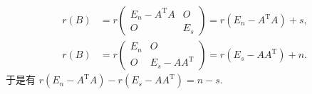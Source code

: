 \documentclass[12pt,fontset=fandol]{ctexart}
\begin{document}
\begin{solve}
            \begin{align*}
                r(B) &= r\begin{pmatrix}
                    E_n - A^\mathrm{T}A & O   \\
                    O                   & E_s
                \end{pmatrix} = r(E_n - A^\mathrm{T}A) + s, \\
                r(B) &= r\begin{pmatrix}
                    E_n & O                   \\
                    O   & E_s - AA^\mathrm{T}
                \end{pmatrix} = r(E_s - AA^\mathrm{T}) + n.
            \end{align*}
            于是有 $r(E_n-A^\mathrm{T}A)-r(E_s-AA^\mathrm{T})=n-s$.
\end{solve}
\end{document}
